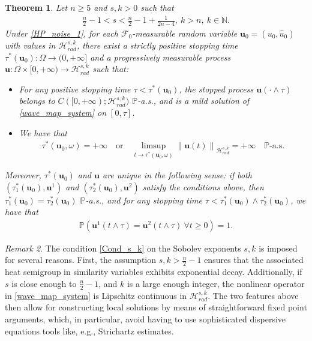 \documentclass[12pt,reqno]{amsart}
\theoremstyle{plain}
\newtheorem{theorem}{Theorem}[section]
\theoremstyle{remark}
\newtheorem{remark}[theorem]{Remark}
\theoremstyle{plain}
\theoremstyle{definition}
\numberwithin{equation}{section}
\numberwithin{equation}{section}
\def\N{{\mathbb N}}
\newcommand{\norm}[1]{\left\|#1\right\|}
\newcommand{\HH}{\mathcal{H}}
\begin{document}
	\begin{theorem}\label{Thm_well_posed}
		Let $n\geq 5$ and $s,k>0$ such that
		\begin{align}\label{Cond_s_k}
			\frac{n}{2}-1<s<\frac{n}{2}-1+\frac{1}{2n-4},\ k>n,\ k\in \N.
		\end{align} 
		Under \autoref{HP_noise_1}, for each $\mathcal{F}_0$-measurable random variable $\mathbf{u}_0=(u_0,\hat{u}_{0})$ with values in $\HH^{s,k}_{rad}$, there exist a strictly positive stopping time $\tau^*(\mathbf{u}_0):\Omega\rightarrow (0,+\infty]$ and a progressively measurable process $\mathbf{u}:\Omega\times [0,+\infty)\rightarrow \HH_{rad}^{s,k}$ such that:
		\begin{itemize}[leftmargin=2em]
			\setlength{\itemsep}{1.5mm}
			\item[i)] For any positive stopping time $\tau < \tau^*(\mathbf{u}_0)$, the stopped process $\mathbf{u}(\cdot \wedge \tau)$ belongs to $C([0, +\infty); \HH_{rad}^{s,k})$ $\mathbb{P}$-a.s., and  is a mild solution of \eqref{wave_map_system} on $[0, \tau]$.
			\item[ii)] We have that 
			\begin{align*}
				\tau^*(\mathbf{u}_0,\omega)=+\infty \quad \text{or} \quad \limsup_{t\rightarrow \tau^*(\mathbf{u}_0,\omega)}\norm{\mathbf{u}(t)}_{\HH_{rad}^{s,k}}=+\infty\quad \mathbb{P}\text{-a.s.}
			\end{align*}    
		\end{itemize}
		Moreover, $\tau^*(\mathbf{u}_0)$ and $\mathbf u$ are unique in the following sense: if both $\left(\tau^{*}_1(\mathbf{u}_0), \mathbf{u}^1\right)$ and $\left(\tau^{*}_2(\mathbf{u}_0), \mathbf{u}^2\right)$ satisfy the conditions above, then $\tau^{*}_1(\mathbf{u}_0) = \tau^{*}_2(\mathbf{u}_0)$ $\mathbb{P}$-a.s., and for any stopping time $\tau < \tau^{*}_1(\mathbf{u}_0) \wedge \tau^{*}_2(\mathbf{u}_0)$, we have that
		\begin{align*}
			\mathbb{P}\left(\mathbf{u}^1(t \wedge \tau)=\mathbf{u}^2(t \wedge \tau)\ \forall t\geq 0\right)=1.
		\end{align*}
	\end{theorem}
	\begin{remark}\label{remark_numbers} 
		The condition \eqref{Cond_s_k} on the Sobolev exponents $s,k$ is imposed for several reasons. First, the assumption $s,k>\frac{n}{2}-1$ ensures that the associated heat semigroup in similarity variables exhibits exponential decay. Additionally, if $s$ is close enough to $\frac{n}{2}-1$, and $k$ is a large enough integer, the nonlinear operator in \eqref{wave_map_system} is  Lipschitz continuous in $\mathcal{H}_{rad}^{s,k}$. The two features above then allow for constructing local solutions by means of straightforward fixed point arguments, which, in particular, avoid having to use sophisticated dispersive equations tools like, e.g., Strichartz estimates.
	\end{remark}
\end{document}
